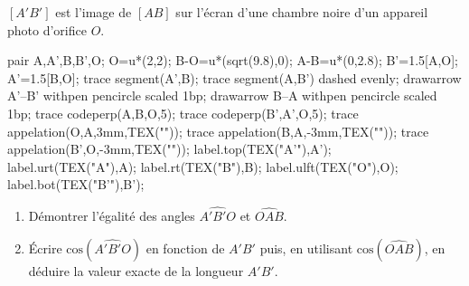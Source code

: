 \begin{exercice*}
    $[A'B']$ est l'image de $[AB]$ sur l'écran d'une chambre noire d'un appareil photo d'orifice $O$.
    \begin{center}
        \begin{Geometrie}
            pair A,A',B,B',O;
            O=u*(2,2);
            B-O=u*(sqrt(9.8),0);
            A-B=u*(0,2.8);
            B'=1.5[A,O];
            A'=1.5[B,O];
            trace segment(A',B);
            trace segment(A,B') dashed evenly;
            drawarrow A'--B' withpen pencircle scaled 1bp;
            drawarrow B--A withpen pencircle scaled 1bp;
            trace codeperp(A,B,O,5);
            trace codeperp(B',A',O,5);
            trace appelation(O,A,3mm,TEX(""));
            trace appelation(B,A,-3mm,TEX(""));
            trace appelation(B',O,-3mm,TEX(""));
            label.top(TEX("A'"),A');
            label.urt(TEX("A"),A);
            label.rt(TEX("B"),B);
            label.ulft(TEX("O"),O);
            label.bot(TEX("B'"),B');
        \end{Geometrie}
    \end{center}
    \begin{enumerate}
        \item Démontrer l'égalité des angles $\widehat{A'B'O}$ et $\widehat{OAB}$.
        \item Écrire $\text{cos}(\widehat{A'B'O})$ en fonction de $A'B'$ puis, en utilisant $\text{cos}(\widehat{OAB})$, en déduire la valeur exacte de la longueur $A'B'$.
    \end{enumerate}
\end{exercice*}
